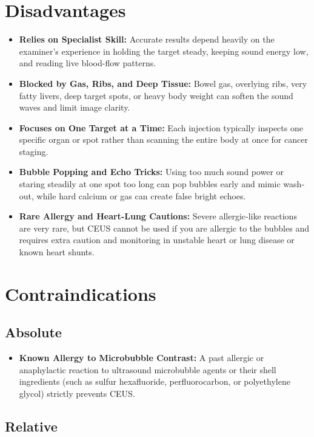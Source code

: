 \section{Disadvantages}

\begin{itemize}
    \item \textbf{Relies on Specialist Skill:} Accurate results depend heavily on the examiner's experience in holding the target steady, keeping sound energy low, and reading live blood-flow patterns.
    \item \textbf{Blocked by Gas, Ribs, and Deep Tissue:} Bowel gas, overlying ribs, very fatty livers, deep target spots, or heavy body weight can soften the sound waves and limit image clarity.
    \item \textbf{Focuses on One Target at a Time:} Each injection typically inspects one specific organ or spot rather than scanning the entire body at once for cancer staging.
    \item \textbf{Bubble Popping and Echo Tricks:} Using too much sound power or staring steadily at one spot too long can pop bubbles early and mimic wash-out, while hard calcium or gas can create false bright echoes.
    \item \textbf{Rare Allergy and Heart-Lung Cautions:} Severe allergic-like reactions are very rare, but CEUS cannot be used if you are allergic to the bubbles and requires extra caution and monitoring in unstable heart or lung disease or known heart shunts.
\end{itemize}

\section{Contraindications}

\subsection{Absolute}

\begin{itemize}
    \item \textbf{Known Allergy to Microbubble Contrast:} A past allergic or anaphylactic reaction to ultrasound microbubble agents or their shell ingredients (such as sulfur hexafluoride, perfluorocarbon, or polyethylene glycol) strictly prevents CEUS.
\end{itemize}

\subsection{Relative}


